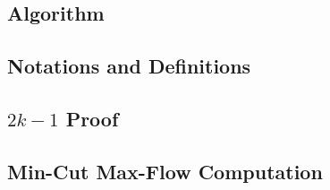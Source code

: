 \subsection{Algorithm}
\label{sec:wfalg}


\subsection{Notations and Definitions}
\label{sec:notdef}

\subsection{$2k-1$ Proof}
\label{sec:2k1p}

\subsection{Min-Cut Max-Flow Computation}
\label{sec:mcmf}
